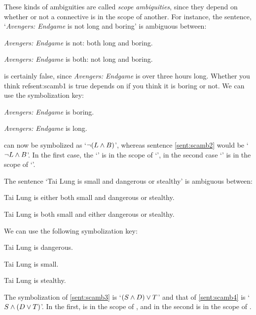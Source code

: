 These kinds of ambiguities are called \emph{scope ambiguities}, since they depend on whether or not a connective is in the scope of another. For instance, the sentence, `\emph{Avengers: Endgame} is not long and boring' is ambiguous between:
\begin{samplesent}
	\item\label{sent:scamb1} \emph{Avengers: Endgame} is not: both long and boring.
	\item\label{sent:scamb2} \emph{Avengers: Endgame} is both: not long and boring.
\end{samplesent}
 is certainly false, since \emph{Avengers: Endgame} is over three hours long. Whether you think ref{sent:scamb1} is true depends on if you think it is boring or not. We can use the symbolization key:
\begin{ekey}
	\item[B] \emph{Avengers: Endgame} is boring.
	\item[L] \emph{Avengers: Endgame} is long.
\end{ekey}
 can now be symbolized as `$\neg(L \mathbin{\wedge} B)$', whereas sentence \cref{sent:scamb2} would be `$\neg L \mathbin{\wedge} B$'. In the first case, the `\eand' is in the scope of `\enot', in the second case `\enot' is in the scope of `\eand'.

The sentence `Tai Lung is small and dangerous or stealthy' is ambiguous between:
\begin{samplesent}
	\item\label{sent:scamb3} Tai Lung is either both small and dangerous or stealthy.
	\item\label{sent:scamb4} Tai Lung is both small and either dangerous or stealthy.
\end{samplesent}
We can use the following symbolization key:
\begin{ekey}
	\item[D] Tai Lung is dangerous.
	\item[S] Tai Lung is small.
	\item[T] Tai Lung is stealthy.
\end{ekey}
The symbolization of \cref{sent:scamb3} is `$(S \mathbin{\wedge} D) \vee T$' and that of \cref{sent:scamb4} is `$S \mathbin{\wedge} (D \vee T)$'. In the first, \eand is in the scope of \eor, and in the second \eor is in the scope of \eand.





